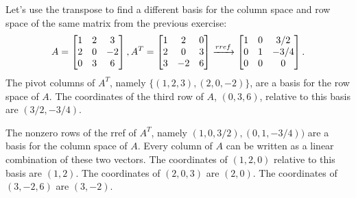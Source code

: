 \begin{example}\label{colspace2ex}
Let's use the transpose to find a different basis for the column space and row space of the same matrix from the previous exercise:  
$$
A=
\begin{bmatrix}
\begin{matrix} 1\\2\\0 \end{matrix}
&\begin{matrix} 2\\0\\3 \end{matrix}
&\begin{matrix} 3\\-2\\6 \end{matrix}
\end{bmatrix},
A^T
=
\begin{bmatrix}
 1 & 2 & 0 \\
 2 & 0 & 3 \\
 3 & -2 & 6
\end{bmatrix}
\xrightarrow{rref}
\begin{bmatrix}
 1 & 0 & {3}/{2} \\
 0 & 1 & -{3}/{4} \\
 0 & 0 & 0
\end{bmatrix}.
$$
The pivot columns of $A^T$, namely $\{(1,2,3), (2,0,-2)\}$, are a basis for the row space of $A$. 
The coordinates of the third row of $A$, $(0,3,6)$, relative to this basis are $(3/2,-3/4)$. 

The nonzero rows of the rref of $A^T$, namely $(1,0,3/2), (0,1,-3/4))$ are a basis for the column space of $A$.  Every column of $A$ can be written as a linear combination of these two vectors. The coordinates of $(1,2,0)$ relative to this basis are $(1,2)$. The coordinates of $(2,0,3)$ are $(2,0)$. The coordinates of $(3,-2,6)$ are $(3,-2)$.  
\end{example}

